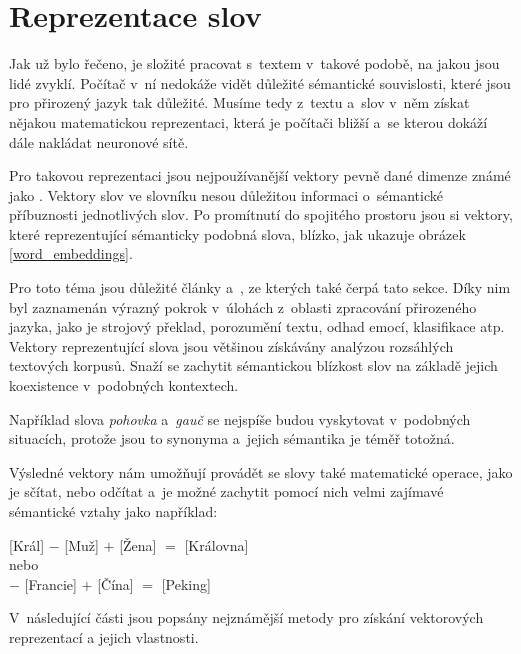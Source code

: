 \section{Reprezentace slov}
\label{reprezentace_slov}
Jak už bylo řečeno, je složité pracovat s~textem v~takové podobě, na jakou jsou lidé zvyklí. Počítač v~ní nedokáže vidět důležité sémantické souvislosti, které jsou pro přirozený jazyk tak důležité. Musíme tedy z~textu a~slov v~něm získat nějakou matematickou reprezentaci, která je počítači bližší a~se kterou dokáží dále nakládat neuronové sítě. \par
Pro takovou reprezentaci jsou nejpoužívanější vektory pevně dané dimenze známé jako . Vektory slov ve slovníku nesou důležitou informaci o~sémantické příbuznosti jednotlivých slov. Po promítnutí do spojitého prostoru jsou si vektory, které reprezentující sémanticky podobná slova, blízko, jak ukazuje obrázek \ref{word_embeddings}.\par
Pro toto téma jsou důležité články \cite{mikolov2013embeddings} a~\cite{mikolov2013_2}, ze kterých také čerpá tato sekce. Díky nim byl zaznamenán výrazný pokrok v~úlohách z~oblasti zpracování přirozeného jazyka, jako je strojový překlad, porozumění textu, odhad emocí, klasifikace atp.
Vektory reprezentující slova jsou většinou získávány analýzou rozsáhlých textových korpusů. Snaží se zachytit sémantickou blízkost slov na základě jejich koexistence v~podobných kontextech.\par 
Například slova \emph{pohovka} a~\emph{gauč} se nejspíše budou vyskytovat v~podobných situacích, protože jsou to synonyma a~jejich sémantika je téměř totožná.\par
Výsledné vektory nám umožňují provádět se slovy také matematické operace, jako je sčítat, nebo odčítat a~je možné zachytit pomocí nich velmi zajímavé sémantické vztahy jako například:
\begin{center}
[Král] $-$ [Muž] $+$ [Žena] $=$ [Královna]\\
\medskip
nebo\\
\medskip
[Paříž] $-$ [Francie] $+$ [Čína] $=$ [Peking]
\end{center}

V~následující části jsou popsány nejznámější metody pro získání vektorových reprezentací a jejich vlastnosti.

